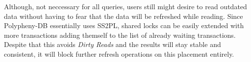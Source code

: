 

Although, not neccessary for all queries, users still might desire to read outdated data without having to fear that the data will be refreshed while reading.
Since Polypheny-DB essentially uses SS2PL, shared locks can be easily extended with more transactions adding themself to the list of already waiting transactions.
Despite that this avoids \emph{Dirty Reads} and the results will stay stable and consistent, it will block further refresh operations on this placement entirely. 

